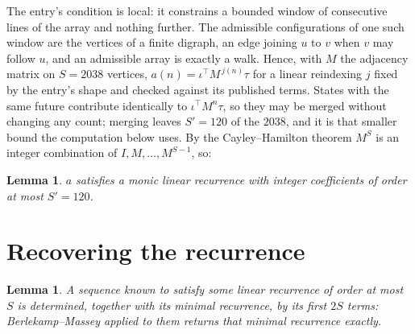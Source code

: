 \documentclass[11pt,a4paper]{article}
\theoremstyle{plain}
\newtheorem{lemma}[theorem]{Lemma}
\theoremstyle{definition}
\begin{document}
The entry's condition is local: it constrains a bounded window of consecutive lines of the
array and nothing further. The admissible configurations of one such window are the vertices
of a finite digraph, an edge joining $u$ to $v$ when $v$ may follow $u$, and an admissible
array is exactly a walk. Hence, with $M$ the adjacency matrix on $S=2038$ vertices,
$a(n)=\iota^{\!\top}M^{\,j(n)}\tau$ for a linear reindexing $j$ fixed by the entry's shape
and checked against its published terms. States with the same future contribute identically to $\iota^{\!\top}M^n\tau$, so they may be merged without changing any count; merging leaves $S'=120$ of the $2038$, and it is that smaller bound the computation below uses. By the Cayley--Hamilton theorem $M^{S}$ is an
integer combination of $I,M,\dots,M^{S-1}$, so:

\begin{lemma}\label{lem:cf}
$a$ satisfies a monic linear recurrence with integer coefficients of order at most
$S'=120$.
\end{lemma}

\section{Recovering the recurrence}

\begin{lemma}\label{lem:bm}
A sequence known to satisfy some linear recurrence of order at most $S$ is determined, together
with its minimal recurrence, by its first $2S$ terms: Berlekamp--Massey applied to them returns
that minimal recurrence exactly.
\end{lemma}
\end{document}
